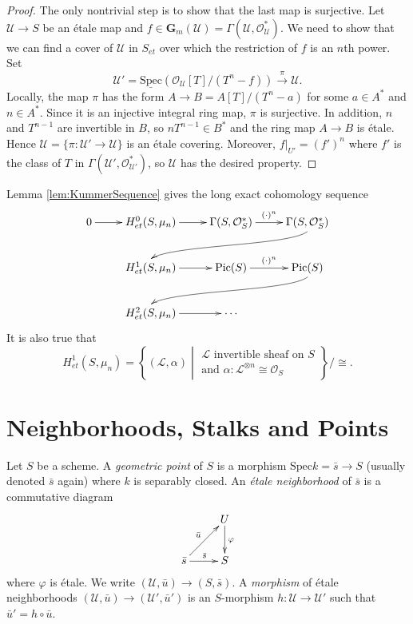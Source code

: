 \begin{proof}
The only nontrivial step is to show that the last map is surjective. Let 
$\mathcal{U} \to S$ be an \'etale map and $f \in \mathbf{G}_m(\mathcal{U}) = 
\Gamma(\mathcal{U}, \mathcal{O}_\mathcal{U}^*)$. We need to show that we can 
find a cover of $\mathcal{U}$ in $S_{et}$ over which the restriction of $f$ is 
an $n$th power. Set
$$
\mathcal{U}' = \underline{\text{Spec}} (\mathcal{O}_\mathcal{U}[T] / (T^n-f)) 
\xrightarrow{\pi} \mathcal{U}.
$$ 
Locally,  the map $\pi$ has the form $A \to B = A[T] / (T^n-a)$ for some $a \in 
A^*$ and $n \in A^*$. Since it is an injective integral ring map, $\pi$ is 
surjective. In addition, $n$ and $T^{n-1}$ are invertible in $B$, so $nT^{n-1} 
\in B^*$ and the ring map $A \to B$ is \'etale. Hence $\mathcal{U} = \{\pi : 
\mathcal{U}' \to \mathcal{U}\}$ is an \'etale covering. Moreover, $f|_{U'} = 
(f')^n$ where $f'$ is the class of $T$ in $\Gamma(\mathcal{U}', 
\mathcal{O}_{\mathcal{U}'}^*)$, so $\mathcal{U}$ has the desired property.  
\end{proof}

\noindent
Lemma \ref{lem:KummerSequence} gives the long exact cohomology sequence
$$
\xymatrix{
0  \ar[r] & H_{et}^0(S, \mu_n) \ar[r] & \Gamma(S, \mathcal{O}_S^*) 
\ar^{(\cdot)^n}[r] & \Gamma(S, \mathcal{O}_S^*) 
\ar@(rd,ul)[rdllllr]
\\ 
& H_{et}^1(S, \mu_n) \ar[r] & \text{Pic}(S) \ar^{(\cdot)^n}[r] & \text{Pic} (S) 
\ar@(rd,ul)[rdllllr] \\
& H_{et}^2(S, \mu_n) \ar[r] & \cdots 
}
$$
It is also true that
$$
H_{et}^1(S, \mu_n) = \left\{(\mathcal{L}, \alpha)\; 
\left| \; 
\begin{array}{c} 
\mathcal{L}\text{ invertible sheaf on } S  \\
\text{and }\alpha: \mathcal{L}^{\otimes n} \cong \mathcal{O}_S
\end{array}
\right.
\right\}
\Big/\cong.
$$

\section{Neighborhoods, Stalks and Points}
\label{section-stalks}

\begin{definition}
Let $S$ be a scheme. A \emph{geometric point} of $S$ is a morphism $\text{Spec} 
k = \bar s \to S$ (usually denoted $\bar s$ again)  where $k$ is separably 
closed. An \emph{\'etale neighborhood} of $\bar s$ is a commutative diagram
$$
\xymatrix{
& U \ar^{\varphi}[d] \\
{\bar s} \ar^{\bar s}[r] \ar^{\bar u}[ur] & S 
}
$$
where $\varphi$ is \'etale. We write $(\mathcal{U}, \bar u)\to (S, \bar s)$. A 
\emph{morphism} of \'etale neighborhoods $(\mathcal{U}, \bar u)\to 
(\mathcal{U}',\bar u')$ is an $S$-morphism $h: \mathcal{U}\to \mathcal{U}'$ 
such that $\bar u'=h\circ\bar u$. 
\end{definition}

